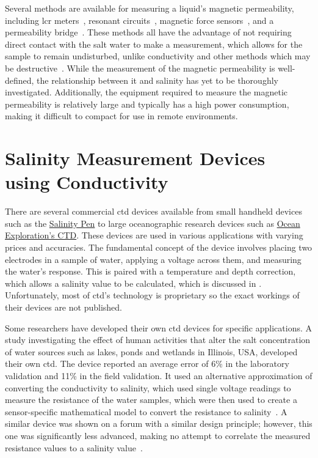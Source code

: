 Several methods are available for measuring a liquid's magnetic permeability, including \gls{lcr} meters~\cite{waltrip_inductance_measurement_2005}, resonant circuits~\cite{alhassoon_complex_permittivity_extraction_2021}, magnetic force sensors~\cite{pattakos_magnetic_permeability_sensor_2023}, and a permeability bridge~\cite{ewing_magnetic_balance_permeability_1898}.
These methods all have the advantage of not requiring direct contact with the salt water to make a measurement, which allows for the sample to remain undisturbed, unlike conductivity and other methods which may be destructive~\cite{tengesdal_electromagnetic_salinity_2014}.
While the measurement of the magnetic permeability is well-defined, the relationship between it and salinity has yet to be thoroughly investigated.
Additionally, the equipment required to measure the magnetic permeability is relatively large and typically has a high power consumption, making it difficult to compact for use in remote environments.

\section{Salinity Measurement Devices using Conductivity}\label{sec:salinity-measurement-devices}

There are several commercial \gls{ctd} devices available from small handheld devices such as the \href{https://euca.co.za/products/salinity-pen?srsltid=AfmBOorAK21_xoeOZbaqoqXbRzrLxF5Yx47nzn7tvsve-_Azl3sSh1-QbIg}{Salinity Pen} to large oceanographic research devices such as \href{https://oceanexplorer.noaa.gov/technology/ctd/ctd.html}{Ocean Exploration's CTD}.
These devices are used in various applications with varying prices and accuracies. 
The fundamental concept of the device involves placing two electrodes in a sample of water, applying a voltage across them, and measuring the water's response.
This is paired with a temperature and depth correction, which allows a salinity value to be calculated, which is discussed in .
Unfortunately, most of \gls{ctd}'s technology is proprietary so the exact workings of their devices are not published.

Some researchers have developed their own \gls{ctd} devices for specific applications.
A study investigating the effect of human activities that alter the salt concentration of water sources such as lakes, ponds and wetlands in Illinois, USA, developed their own \gls{ctd}.
The device reported an average error of 6\% in the laboratory validation and 11\% in the field validation.
It used an alternative approximation of converting the conductivity to salinity, which used single voltage readings to measure the resistance of the water samples, which were then used to create a sensor-specific mathematical model to convert the resistance to salinity~\cite{benjankar_ec_based_salt_measurement_2021}.
A similar device was shown on a forum with a similar design principle; however, this one was significantly less advanced, making no attempt to correlate the measured resistance values to a salinity value~\cite{instructables_water_salinity_meter}.


